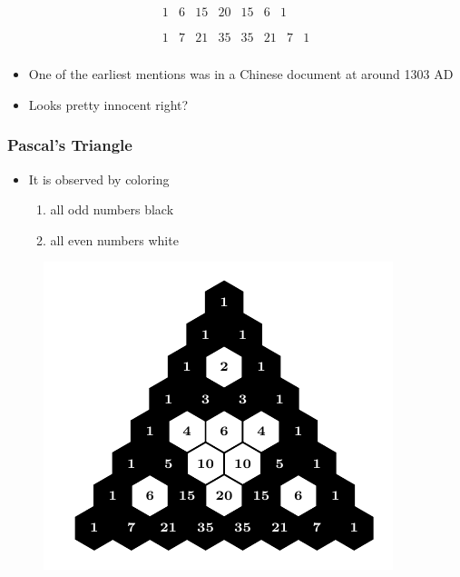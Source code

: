 \documentclass{beamer}
\begin{document}
\begin{frame}
\begin{equation*}
\begin{array}{c}
            \begin{array}{ccccccc}
             1 & 6 & 15 & 20 & 15 & 6 & 1 \\
            \end{array}
             \\
            \begin{array}{cccccccc}
             1 & 7 & 21 & 35 & 35 & 21 & 7 & 1 \\
            \end{array}
        \end{array}
    \end{equation*}
    \begin{itemize}
        \item
        One of the earliest mentions was in a Chinese document at around 1303 AD
        \item
        Looks pretty innocent right?
    \end{itemize}

\end{frame}

\begin{frame}
    \frametitle{Pascal's Triangle}
    \begin{itemize}
        \item It is observed by coloring 
        \begin{enumerate}
            \item all odd numbers black
            \item all even numbers white
        \end{enumerate}
    \end{itemize}
    \begin{figure}
        \centering
        \includegraphics[scale=0.8]{Mod2,7.pdf}
    \end{figure}
    \let\thefootnote\relax{}
\end{frame}
\end{document}
